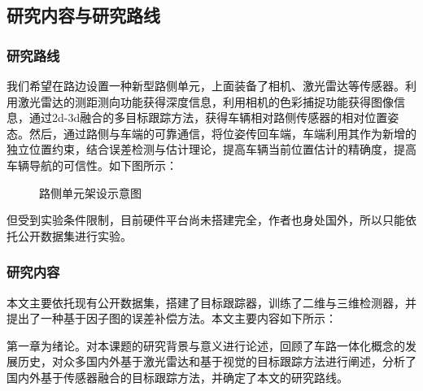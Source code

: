\subsection{研究内容与研究路线}

\subsubsection{研究路线}

我们希望在路边设置一种新型路侧单元，上面装备了相机、激光雷达等传感器。利用激光雷达的测距测向功能获得深度信息，利用相机的色彩捕捉功能获得图像信息，通过2d-3d融合的多目标跟踪方法，获得车辆相对路侧传感器的相对位置姿态。然后，通过路侧与车端的可靠通信，将位姿传回车端，车端利用其作为新增的独立位置约束，结合误差检测与估计理论，提高车辆当前位置估计的精确度，提高车辆导航的可信性。如下图所示：

\begin{figure}[htb] 
    \caption{路侧单元架设示意图}
\end{figure}

但受到实验条件限制，目前硬件平台尚未搭建完全，作者也身处国外，所以只能依托公开数据集进行实验。

\subsubsection{研究内容}

本文主要依托现有公开数据集，搭建了目标跟踪器，训练了二维与三维检测器，并提出了一种基于因子图的误差补偿方法。本文主要内容如下所示：

第一章为绪论。对本课题的研究背景与意义进行论述，回顾了车路一体化概念的发展历史，对众多国内外基于激光雷达和基于视觉的目标跟踪方法进行阐述，分析了国内外基于传感器融合的目标跟踪方法，并确定了本文的研究路线。

